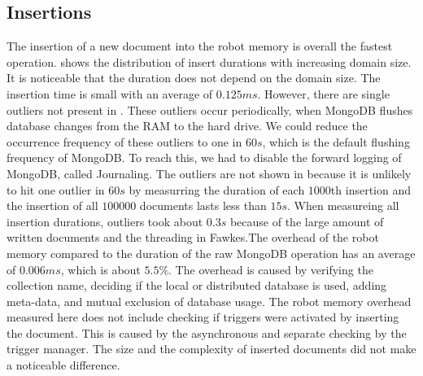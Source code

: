 \subsection{Insertions}
The insertion of a new document into the robot memory is overall the
fastest operation.
 shows the distribution of
insert durations with increasing domain size. It is noticeable that the
duration does not depend on the domain size. The insertion time is small with an average of
$0.125ms$. However, there are single outliers not present in
. These outliers occur periodically, when
MongoDB flushes database changes from the RAM to the hard drive. We
could reduce the occurrence frequency of these outliers to one in $60s$, which is the
default flushing frequency of MongoDB. To reach this, we had to
disable the forward logging of MongoDB, called Journaling. The
outliers are not shown in 
because it is unlikely to hit one outlier in $60s$ by measurring the
duration of each $1000$th insertion and the insertion of all $100000$
documents lasts less than $15s$. When measureing all insertion durations,
outliers took about $0.3s$ because of the
large amount of written documents and the threading in Fawkes.The
overhead of the robot memory compared to the duration of the raw
MongoDB operation has an average of $0.006ms$, which is about $5.5\%$.
The overhead is caused by verifying the collection name, deciding if
the local or distributed database is used, adding meta-data, and
mutual exclusion of database usage. The robot memory overhead measured
here does not include checking if triggers were activated by inserting
the document. This is caused by the asynchronous and separate checking by
the trigger manager. The size and the complexity of inserted
documents did not make a noticeable difference.

